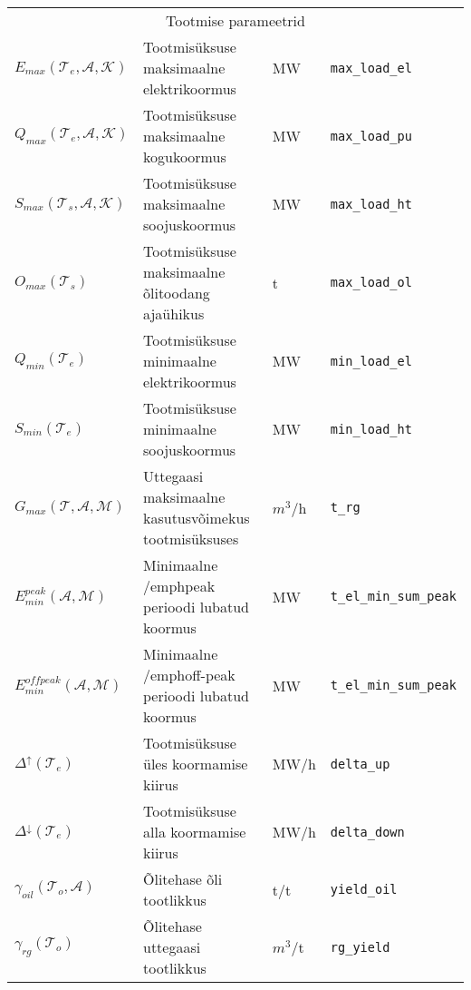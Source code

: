 \begin{landscape}
\begin{longtable}{l l l l}
\\ \multicolumn{4}{c}{Tootmise parameetrid} \\
$\mathit{E}_{max}(\mathcal{T}_e, \mathcal{A},\mathcal{K})$ & Tootmisüksuse maksimaalne elektrikoormus & MW & \texttt{max\_load\_el} \\
$\mathit{Q}_{max}(\mathcal{T}_e, \mathcal{A},\mathcal{K})$ & Tootmisüksuse maksimaalne kogukoormus & MW  & \texttt{max\_load\_pu} \\
$\mathit{S}_{max}(\mathcal{T}_s, \mathcal{A},\mathcal{K})$ & Tootmisüksuse maksimaalne soojuskoormus & MW & \texttt{max\_load\_ht}\\
$\mathit{O}_{max}(\mathcal{T}_s)$ & Tootmisüksuse maksimaalne õlitoodang ajaühikus & t & \texttt{max\_load\_ol} \\
$\mathit{Q}_{min}(\mathcal{T}_e)$ & Tootmisüksuse minimaalne elektrikoormus & MW & \texttt{min\_load\_el}\\
$\mathit{S}_{min}(\mathcal{T}_e)$ & Tootmisüksuse minimaalne soojuskoormus & MW & \texttt{min\_load\_ht}\\
$\mathit{G}_{max}(\mathcal{T}, \mathcal{A}, \mathcal{M})$&Uttegaasi maksimaalne kasutusvõimekus tootmisüksuses& $m^3$/h&\texttt{t\_rg}\\
$\mathit{E}_{min}^{peak}(\mathcal{A}, \mathcal{M})$& Minimaalne /emph{peak} perioodi lubatud koormus & MW & \texttt{t\_el\_min\_sum\_peak} \\
$\mathit{E}_{min}^{offpeak}(\mathcal{A}, \mathcal{M})$&Minimaalne /emph{off-peak} perioodi lubatud koormus & MW & \texttt{t\_el\_min\_sum\_peak} \\


$\mathit{\Delta^{\uparrow}}(\mathcal{T}_e)$ & Tootmisüksuse üles koormamise kiirus & MW/h & \texttt{delta\_up} \\
$\mathit{\Delta^{\downarrow}}(\mathcal{T}_e)$ & Tootmisüksuse alla koormamise kiirus & MW/h & \texttt{delta\_down} \\

$\mathit{\gamma}_{oil}(\mathcal{T}_o, \mathcal{A})$ & Õlitehase õli tootlikkus & t/t & \texttt{yield\_oil} \\
$\mathit{\gamma}_{rg}(\mathcal{T}_o)$ & Õlitehase uttegaasi tootlikkus & $m^3$/t & \texttt{rg\_yield} \\


\end{longtable}
\end{landscape}

